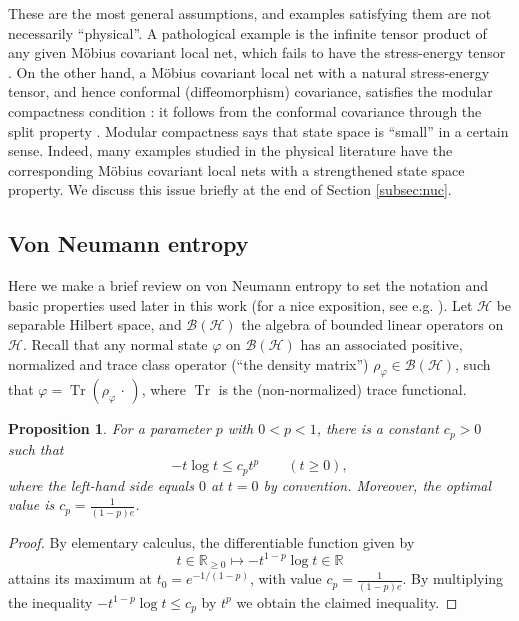 \documentclass[a4paper,12pt]{article}
\theoremstyle{plain}
\newtheorem{prop}[theo]{Proposition}
\theoremstyle{definition}
\theoremstyle{remark}
\def\RR{{\mathbb R}}
\def\B{{\mathcal B}}
\def\H{{\mathcal H}}
\def\f{\varphi}
\DeclareMathOperator{\Tr}{Tr}
\begin{document}
These are the most general assumptions, and examples satisfying them are not necessarily ``physical''.
A pathological example is the infinite tensor product of any given M\"obius covariant local net,
which fails to have the stress-energy tensor \cite[Section 6]{CW05}.
On the other hand, a M\"obius covariant local net with a natural stress-energy tensor,
and hence conformal (diffeomorphism) covariance, satisfies the modular compactness condition \cite{bdl90a}:
it follows from the conformal covariance through the split property \cite{mtw16}.
Modular compactness says that state space is ``small'' in a certain sense.
Indeed, many examples studied in the physical literature have the corresponding M\"obius covariant local nets
with a strengthened state space property.
We discuss this issue briefly at the end of Section \ref{subsec:nuc}.



\subsection{Von Neumann entropy}
\label{subsec:Svn}

Here we make a brief review on von Neumann entropy to set the notation and basic properties used later in this work
(for a nice exposition, see e.g.\! \cite{ohyapetz}). Let $\H$ be separable Hilbert space, and $\B(\H)$
the algebra of bounded linear operators on $\H$.
Recall that any normal state $\f$ on $\B(\H)$ has an associated positive, normalized and trace class operator
(``the density matrix'') $\rho_\f \in \B(\H)$, such that $\f = \Tr(\rho_\f \,\cdot\,)$, where $\Tr$ is the (non-normalized) trace functional.


\begin{prop}\label{pro:etalp}
  For a parameter $p$ with $0<p<1$, there is a constant $c_p>0$ such that
  \[ -t\log t \le c_p t^p \qquad (t \ge 0),\]
  where the left-hand side equals $0$ at $t = 0$ by convention.
  Moreover, the optimal value is $c_p = \frac{1}{(1-p)e}$.
\end{prop}
\begin{proof} By elementary calculus, the differentiable function given by
\[t\in \RR_{\ge 0} \mapsto -t^{1-p}\log t \in \RR \]
attains its maximum at $t_0=e^{-1/(1-p)}$, with value $c_p = \frac1{(1-p)e}$.
By multiplying the inequality $-t^{1-p}\log t \le c_p$ by $t^p$ we obtain the claimed inequality.
\end{proof}
\end{document}
